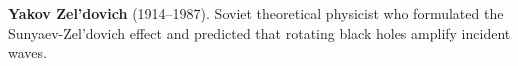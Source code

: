 \textbf{Yakov Zel'dovich} (1914–1987). Soviet theoretical physicist who formulated the Sunyaev-Zel'dovich effect and predicted that rotating black holes amplify incident waves.

